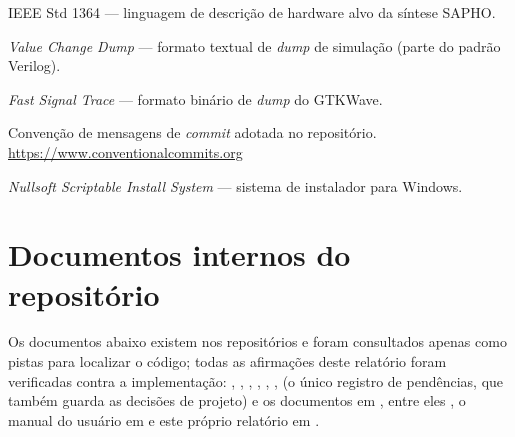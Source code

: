 \begin{description}[style=nextline,leftmargin=0pt]
\item[Verilog HDL] IEEE Std 1364 --- linguagem de descrição de hardware alvo da síntese SAPHO.
\item[VCD] \textit{Value Change Dump} --- formato textual de \textit{dump} de simulação (parte do
padrão Verilog).
\item[FST] \textit{Fast Signal Trace} --- formato binário de \textit{dump} do GTKWave.
\item[Conventional Commits] Convenção de mensagens de \textit{commit} adotada no repositório.
\url{https://www.conventionalcommits.org}
\item[NSIS] \textit{Nullsoft Scriptable Install System} --- sistema de instalador para Windows.
\end{description}

\section{Documentos internos do repositório}

Os documentos abaixo existem nos repositórios e foram consultados apenas como pistas para localizar
o código; todas as afirmações deste relatório foram verificadas contra a implementação:
, , , ,
, ,  (o único registro de pendências,
que também guarda as decisões de projeto) e os documentos em , entre eles
, o manual do usuário em  e este
próprio relatório em .
